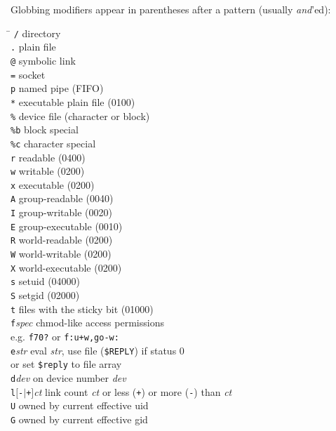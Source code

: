 \documentclass{article}
\newcommand\I[1]{\textsl{#1}}
\newcommand\T[1]{\texttt{#1}}
\newcommand\Lsq{\ensuremath{\boldsymbol{[}}}
\newcommand\Rsq{\ensuremath{\boldsymbol{]}}}
\begin{document}
\begin{multicols}{3}
Globbing modifiers appear in parentheses after a pattern (usually
\I{and}'ed):
\begin{tabbing}
\hskip 40pt \= \kill
\verb!/!       \> directory \\
\verb!.!       \> plain file \\
\verb!@!       \> symbolic link \\
\verb!=!       \> socket \\
\verb!p!       \> named pipe (FIFO) \\
\verb!*!       \> executable plain file (0100) \\
\verb!%!       \> device file (character or block) \\
\verb!%b!      \> block special \\
\verb!%c!      \> character special \\
\verb!r!       \> readable (0400) \\
\verb!w!       \> writable (0200) \\
\verb!x!       \> executable (0200) \\
\verb!A!       \> group-readable (0040) \\
\verb!I!       \> group-writable (0020) \\
\verb!E!       \> group-executable (0010) \\
\verb!R!       \> world-readable (0200) \\
\verb!W!       \> world-writable (0200) \\
\verb!X!       \> world-executable (0200) \\
\verb!s!       \> setuid (04000) \\
\verb!S!       \> setgid (02000) \\
\verb!t!       \> files with the sticky bit (01000) \\
\T{f}\I{spec}  \> chmod-like access permissions \\
               \> e.g. \verb!f70?! or \verb!f:u+w,go-w:! \\
\T{e}\I{str}   \> eval \I{str}, use file (\verb!$REPLY!) if status 0 \\
               \> or set \verb!$reply! to file array \\
\T{d}\I{dev} \> on device number \I{dev} \\
\T{l}\Lsq\T{-}$\mid$\T{+}\Rsq\I{ct}
           \> link count \I{ct} or less (\T{+}) or more (\T{-}) than \I{ct} \\
\T{U}          \> owned by current effective uid \\
\T{G}          \> owned by current effective gid \\

\end{tabbing}
\end{multicols}
\end{document}
